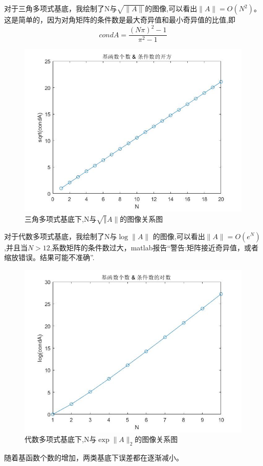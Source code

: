 \documentclass{article}
\begin{document}
对于三角多项式基底，我绘制了N与$\sqrt{\|A\|}$的图像,可以看出$\|A\|=O(N^{2})$。这是简单的，因为对角矩阵的条件数是最大奇异值和最小奇异值的比值,即$$condA=\frac{(N\pi)^{2}-1}{\pi^{2}-1}$$
\begin{figure}[H]
\centering
\includegraphics[scale=0.39]{N_sqrt_condA.jpg}
\caption{\label{N_sqrt_condA}三角多项式基底下,N与$\sqrt\|A\|$的图像关系图}
\end{figure}
对于代数多项式基底，我绘制了N与$\log{\|A\|}$ 的图像,可以看出$\|A\|=O(e^{N})$,并且当$N>12$,系数矩阵的条件数过大，matlab报告“警告:矩阵接近奇异值，或者缩放错误。结果可能不准确”.
\begin{figure}[H]
\centering
\includegraphics[scale=0.39]{N_logcondA.jpg}
\caption{\label{N_logcondA}代数多项式基底下,N与$\exp{\|A\|_{2}}$的图像关系图}
\end{figure}

随着基函数个数的增加，两类基底下误差都在逐渐减小。
\end{document}
